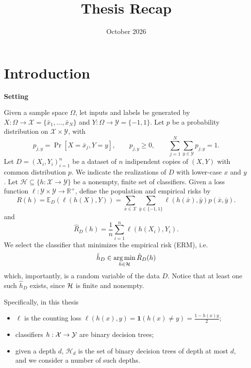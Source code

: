 \documentclass[reqno]{amsart}
\title{Thesis Recap}
\author{October 2026}
\begin{document}
\maketitle

\section*{Introduction}


{\bf Setting}

Given a sample space $\Omega$, let inputs and labels be generated by $X:\Omega \to \mathcal X = \{\bar x_1,\ldots,\bar x_N\}$ and $Y: \Omega \to \mathcal Y = \{-1, 1\}$. Let $p$ be a probability distribution on $\mathcal X\times\mathcal Y$, with
\[
 p_{j,y}=\Pr[X=\bar x_j,Y=y],\qquad
 p_{j,y}\ge0,\qquad
 \sum_{j=1}^N\sum_{y\in\mathcal Y}p_{j,y}=1.
\]
Let $D = {(X_i, Y_i)}_{i=1}^n$ be a dataset of $n$ indipendent copies of $(X,Y)$ with common distribution $p$. We indicate the realizations of $D$ with lower-case $x$ and $y$. 
Let $\mathcal H \subseteq \{h:\mathcal X \to \mathcal Y\}$ be a nonempty, finite set of classifiers. 
Given a loss function $\ell:\mathcal Y \times \mathcal Y \to \mathbb R^+$, define the population and empirical risks by
\[
    R(h) = \mathbb E_D(\ell(h(X), Y)) = \sum_{\bar x\in\mathcal X} \sum_{\bar y \in\{-1,1\}} \ell(h(\bar x), \bar y) p(\bar x, \bar y).
\]
and
\[
    \hat R_D (h) = \frac{1}{n}\sum_{i=1}^n \ell(h(X_i), Y_i).
\]
We select the classifier that minimizes the empirical risk (ERM), i.e.
\begin{equation*}\label{eq: ERM}
    \hat h_D \in \operatorname*{arg\,min}_{h\in \mathcal H} \hat R_D (h)
\end{equation*}
which, importantly, is a random variable of the data $D$. Notice that at least one such $\hat h_D$ exists, since $\mathcal{H}$ is finite and nonempty.

Specifically, in this thesis 
\begin{itemize}
    \item $\ell$ is the counting loss $\ell(h(x), y) = \mathbf{1} (h(x)\neq y) = \frac{1 - h(x)y}{2}$;
    \item classifiers $h:\mathcal{X}\to\mathcal{Y}$ are  binary decision trees;
    \item given a depth $d$, $\mathcal H_d$ is the set of binary decision trees of depth at most $d$, and we consider a number of such depths. 
\end{itemize}
\bigskip 
\end{document}
